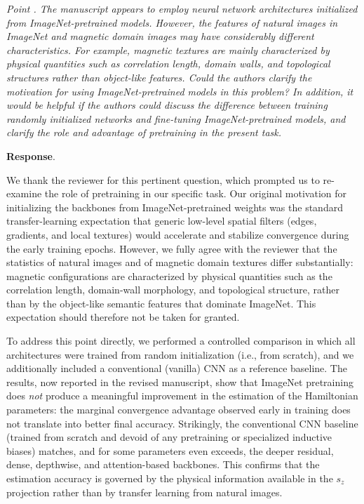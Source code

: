 \documentclass[review,12pt]{report}
\newenvironment{reviewer}{\setcounter{pointcounter}{1}}{}
\newcommand{\point}[1]{\medskip \noindent
 \textsl{{\fontseries{b}\selectfont Point \thepointcounter}.
 \stepcounter{pointcounter} #1}}
\newcommand{\reply}{\medskip \noindent \textbf{Response}.\ }
\begin{document}
\begin{reviewer}
\point{The manuscript appears to employ neural network architectures initialized from ImageNet-pretrained models. However, the features of natural images in ImageNet and magnetic domain images may have considerably different characteristics. For example, magnetic textures are mainly characterized by physical quantities such as correlation length, domain walls, and topological structures rather than object-like features. Could the authors clarify the motivation for using ImageNet-pretrained models in this problem? In addition, it would be helpful if the authors could discuss the difference between training randomly initialized networks and fine-tuning ImageNet-pretrained models, and clarify the role and advantage of pretraining in the present task.}

\reply{We thank the reviewer for this pertinent question, which prompted us to re-examine the role of pretraining in our specific task. Our original motivation for initializing the backbones from ImageNet-pretrained weights was the standard transfer-learning expectation that generic low-level spatial filters (edges, gradients, and local textures) would accelerate and stabilize convergence during the early training epochs. However, we fully agree with the reviewer that the statistics of natural images and of magnetic domain textures differ substantially: magnetic configurations are characterized by physical quantities such as the correlation length, domain-wall morphology, and topological structure, rather than by the object-like semantic features that dominate ImageNet. This expectation should therefore not be taken for granted.

To address this point directly, we performed a controlled comparison in which all architectures were trained from random initialization (i.e., from scratch), and we additionally included a conventional (vanilla) CNN as a reference baseline. The results, now reported in the revised manuscript, show that ImageNet pretraining does \emph{not} produce a meaningful improvement in the estimation of the Hamiltonian parameters: the marginal convergence advantage observed early in training does not translate into better final accuracy. Strikingly, the conventional CNN baseline (trained from scratch and devoid of any pretraining or specialized inductive biases) matches, and for some parameters even exceeds, the deeper residual, dense, depthwise, and attention-based backbones. This confirms that the estimation accuracy is governed by the physical information available in the $s_z$ projection rather than by transfer learning from natural images.

}
\end{reviewer}
\end{document}
